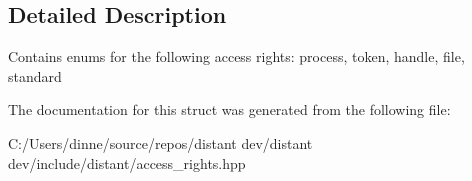 \subsection{Detailed Description}
Contains enums for the following access rights\+: process, token, handle, file, standard 

The documentation for this struct was generated from the following file\+:\begin{DoxyCompactItemize}
\item 
C\+:/\+Users/dinne/source/repos/distant dev/distant dev/include/distant/access\+\_\+rights.\+hpp\end{DoxyCompactItemize}
